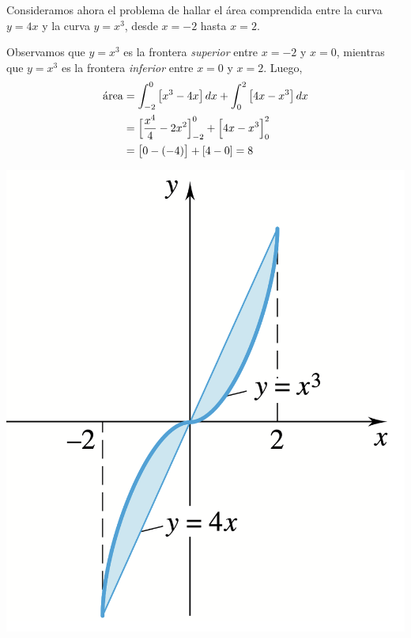   \begin{example}
    Consideramos ahora el problema de hallar el área comprendida entre la curva $y=4x$ y la curva $y=x^3$, desde $x=-2$ hasta $x=2$.

    \noindent
    \begin{minipage}{.55\textwidth}
      Observamos que $y=x^3$ es la frontera \emph{superior} entre $x=-2$ y $x=0$, mientras que $y=x^3$ es la frontera \emph{inferior} entre $x=0$ y $x=2$.
      Luego,
      \begin{align*}
        \mathrm{\protect\acute{a}rea}
        &= 
        \int_{-2}^0 \big[x^3-4x\big]\,dx 
        +
        \int_0^2 \big[4x-x^3\big]\,dx 
        \\
        &= 
        \Big[\frac{x^4}4-2x^2\Big]_{-2}^0
        +
        \Big[4x-x^3\Big]_0^2 
        \\
        &= \big[0-(-4)\big]+[4-0]=8
      \end{align*}
    \end{minipage}
    \begin{minipage}{.44\textwidth}
      \includegraphics[width=.95\textwidth]{pics/areas-6.png}
    \end{minipage}    
  \end{example}

